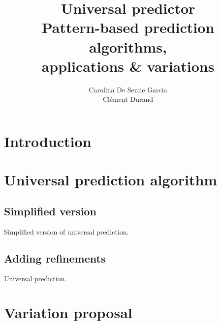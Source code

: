 \documentclass[a4paper,12pt]{article}
\title{%
  Universal predictor\\\small%
  Pattern-based prediction algorithms,\\%
  applications \& variations%
}
\author{%
  Carolina De Senne Garcia\\%
  Clément Durand%
}
\begin{document}
\maketitle

\vspace*{\fill}

\begin{abstract}
  \lipsum[1-2]
\end{abstract}

\vspace*{\fill}

\clearpage

\tableofcontents

\clearpage

\section*{Introduction}

\section{Universal prediction algorithm}

  \subsection{Simplified version}

    \begin{algorithm}

      \caption{\label{simplified}Simplified version of universal prediction.}
    \end{algorithm}

  \subsection{Adding refinements}

    \begin{algorithm}

      \caption{\label{simplified}Universal prediction.}
    \end{algorithm}

\section{Variation proposal}
\end{document}
